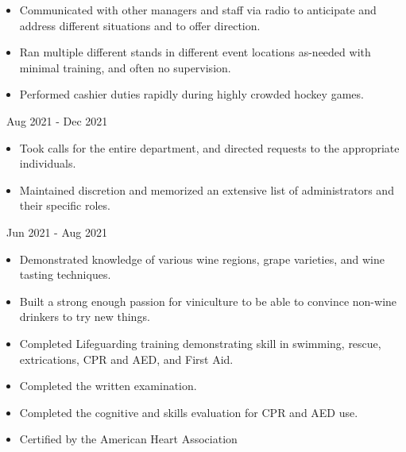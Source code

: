 \documentclass[11pt,letterpaper,ragged2e]{altacv}
\begin{document}
{
	\begin{itemize}
		\item{Communicated with other managers and staff via radio to anticipate and address different situations and to offer direction.}
		\item{Ran multiple different stands in different event locations as-needed with minimal training, and often no supervision.}
		\item{Performed cashier duties rapidly during highly crowded hockey games.}
	\end{itemize}
}
{\faCalendar\, Aug 2021 - Dec 2021}
{
}

{
	\begin{itemize}
		\item{Took calls for the entire department, and directed requests to the appropriate individuals.}
		\item{Maintained discretion and memorized an extensive list of administrators and their specific roles.}
	\end{itemize}
}
{\faCalendar\, Jun 2021 - Aug 2021}
{
}



{
	\begin{itemize}
		\item{Demonstrated knowledge of various wine regions, grape varieties, and wine tasting techniques.}
		\item{Built a strong enough passion for viniculture to be able to convince non-wine drinkers to try new things.}
	\end{itemize}
}
{
}

{
	\begin{itemize}
		\item{Completed Lifeguarding training demonstrating skill in swimming, rescue, extrications, CPR and AED, and  First Aid.}
		\item{Completed the written examination.}
	\end{itemize}
}
{
}

{
	\begin{itemize}
		\item{Completed the cognitive and skills evaluation for CPR and AED use.}
		\item{Certified by the American Heart Association}
	\end{itemize}
}
{
}


\clearpage

\nocite{*}
\end{document}
